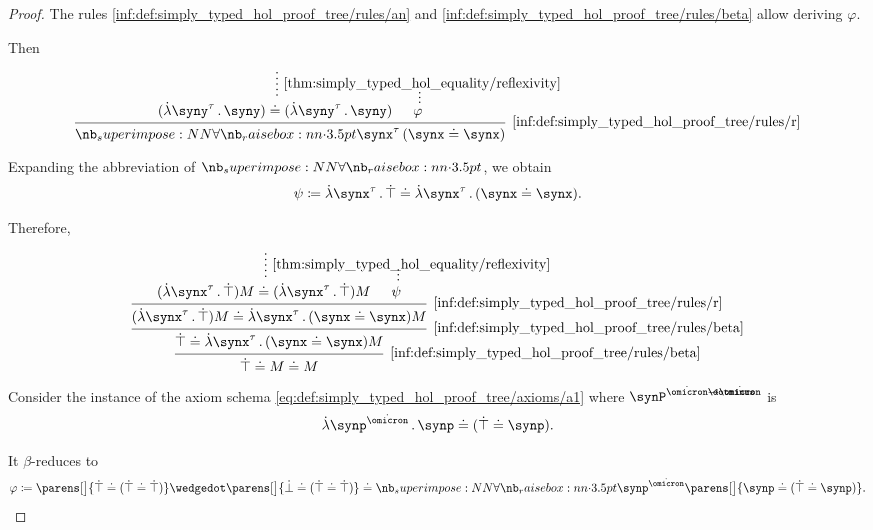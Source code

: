 \begin{proof}
  The rules \ref{inf:def:simply_typed_hol_proof_tree/rules/an} and \ref{inf:def:simply_typed_hol_proof_tree/rules/beta} allow deriving \( \varphi \).

  Then
  \begin{equation*}
    \begin{prooftree}
      \hypo{}
      \ellipsis { \ref{thm:simply_typed_hol_equality/reflexivity} } { (\qabs {\syny^\tau} \syny) \syneq (\qabs {\syny^\tau} \syny) }

      \hypo{}
      \ellipsis {} { \varphi }
      \infer2[\ref{inf:def:simply_typed_hol_proof_tree/rules/r}]{ \qforall {\synx^\tau} (\synx \syneq \synx) }
    \end{prooftree}
  \end{equation*}

  Expanding the abbreviation of \( \synforall \), we obtain
  \begin{equation*}
    \psi \coloneqq \qabs {\synx^\tau} \syntop \syneq \qabs {\synx^\tau} (\synx \syneq \synx).
  \end{equation*}

  Therefore,
  \begin{equation*}
    \begin{prooftree}
      \hypo{}
      \ellipsis { \ref{thm:simply_typed_hol_equality/reflexivity} } { (\qabs {\synx^\tau} \syntop) M \syneq (\qabs {\synx^\tau} \syntop) M }

      \hypo{}
      \ellipsis {} { \psi }

      \infer2[\ref{inf:def:simply_typed_hol_proof_tree/rules/r}]{ (\qabs {\synx^\tau} \syntop) M \syneq \qabs {\synx^\tau} (\synx \syneq \synx) M }
      \infer1[\ref{inf:def:simply_typed_hol_proof_tree/rules/beta}]{ \syntop \syneq \qabs {\synx^\tau} (\synx \syneq \synx) M }
      \infer1[\ref{inf:def:simply_typed_hol_proof_tree/rules/beta}]{ \syntop \syneq M \syneq M }
    \end{prooftree}
  \end{equation*}

   Consider the instance of the axiom schema \eqref{eq:def:simply_typed_hol_proof_tree/axioms/a1} where \( \synP^{\syn\omicron \synimplies \syn\omicron} \) is
  \begin{equation*}
    \qabs {\synp^{\syn\omicron}} \synp \syneq (\syntop \syneq \synp).
  \end{equation*}

  It \( \beta \)-reduces to
  \begin{equation*}
    \varphi \coloneqq \parens[\big]{ \syntop \syneq (\syntop \syneq \syntop) } \synwedge \parens[\big]{ \synbot \syneq (\syntop \syneq \syntop) } \syneq \synforall {\synp^{\syn\omicron}} \parens[\big]{ \synp \syneq (\syntop \syneq \synp) }.
  \end{equation*}


\end{proof}
